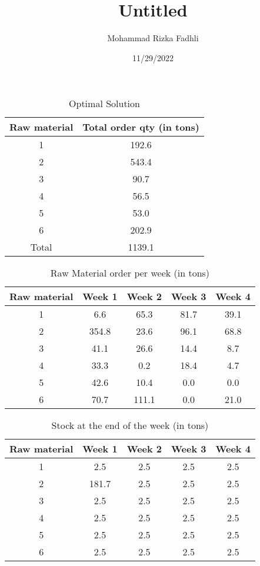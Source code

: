 \documentclass[
]{article}
\title{Untitled}
\author{Mohammad Rizka Fadhli}
\date{11/29/2022}
\begin{document}
\maketitle

\newpage

\begin{table}

\caption{\label{tab:unnamed-chunk-1}Optimal Solution}
\centering
\begin{tabular}[t]{c|c}
\hline
Raw material & Total order qty (in tons)\\
\hline
1 & 192.6\\
\hline
2 & 543.4\\
\hline
3 & 90.7\\
\hline
4 & 56.5\\
\hline
5 & 53.0\\
\hline
6 & 202.9\\
\hline
Total & 1139.1\\
\hline
\end{tabular}
\end{table}

\begin{table}

\caption{\label{tab:unnamed-chunk-1}Raw Material order per week (in tons)}
\centering
\begin{tabular}[t]{c|c|c|c|c}
\hline
Raw material & Week 1 & Week 2 & Week 3 & Week 4\\
\hline
1 & 6.6 & 65.3 & 81.7 & 39.1\\
\hline
2 & 354.8 & 23.6 & 96.1 & 68.8\\
\hline
3 & 41.1 & 26.6 & 14.4 & 8.7\\
\hline
4 & 33.3 & 0.2 & 18.4 & 4.7\\
\hline
5 & 42.6 & 10.4 & 0.0 & 0.0\\
\hline
6 & 70.7 & 111.1 & 0.0 & 21.0\\
\hline
\end{tabular}
\end{table}

\begin{table}

\caption{\label{tab:unnamed-chunk-1}Stock at the end of the week (in tons)}
\centering
\begin{tabular}[t]{c|c|c|c|c}
\hline
Raw material & Week 1 & Week 2 & Week 3 & Week 4\\
\hline
1 & 2.5 & 2.5 & 2.5 & 2.5\\
\hline
2 & 181.7 & 2.5 & 2.5 & 2.5\\
\hline
3 & 2.5 & 2.5 & 2.5 & 2.5\\
\hline
4 & 2.5 & 2.5 & 2.5 & 2.5\\
\hline
5 & 2.5 & 2.5 & 2.5 & 2.5\\
\hline
6 & 2.5 & 2.5 & 2.5 & 2.5\\
\hline
\end{tabular}
\end{table}
\end{document}
